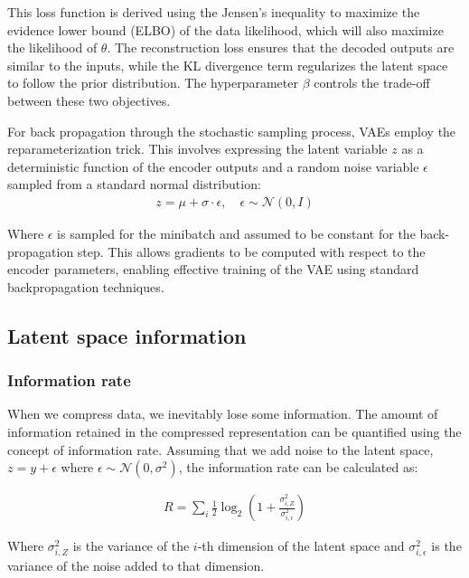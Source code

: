 \documentclass[conference,a4paper]{IEEEtran}
\begin{document}
This loss function is derived using the Jensen's inequality to maximize the evidence lower bound (ELBO) of the data likelihood, which will also maximize the likelihood of $\theta$. The reconstruction loss ensures that the decoded outputs are similar to the inputs, while the KL divergence term regularizes the latent space to follow the prior distribution. The hyperparameter $\beta$ controls the trade-off between these two objectives.

For back propagation through the stochastic sampling process, VAEs employ the reparameterization trick. This involves expressing the latent variable $z$ as a deterministic function of the encoder outputs and a random noise variable $\epsilon$ sampled from a standard normal distribution:
\begin{align}
z = \mu + \sigma \cdot \epsilon, \quad \epsilon \sim \mathcal{N}(0, I)
\end{align}

Where $\epsilon$ is sampled for the minibatch and assumed to be constant for the back-propagation step. This allows gradients to be computed with respect to the encoder parameters, enabling effective training of the VAE using standard backpropagation techniques.


\subsection{Latent space information}

\subsubsection{Information rate}

When we compress data, we inevitably lose some information. The amount of information retained in the compressed representation can be quantified using the concept of information rate. Assuming that we add noise to the latent space, $z = y + \epsilon$ where $\epsilon \sim \mathcal{N}(0, \sigma^2)$, the information rate can be calculated as:

\begin{align}
R = \sum_i \frac{1}{2} \log_2 \left(1 + \frac{\sigma_{i,Z}^2}{\sigma_{i, \epsilon}^2}\right)
\label{eq:info_rate}
\end{align}

Where $\sigma_{i,Z}^2$ is the variance of the $i$-th dimension of the latent space and $\sigma_{i, \epsilon}^2$ is the variance of the noise added to that dimension.
\end{document}
